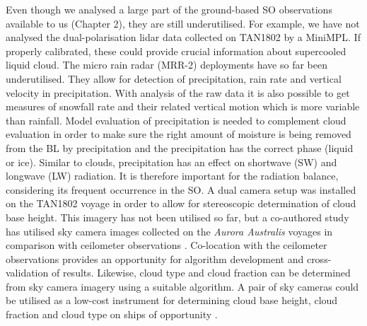 Even though we analysed a large part of the ground-based SO observations
available to us (Chapter 2), they are still underutilised. For example,
we have not analysed the dual-polarisation lidar data collected on TAN1802
by a MiniMPL. If properly calibrated, these could provide crucial information
about supercooled liquid cloud. The micro rain radar (MRR-2) deployments
have so far been underutilised. They allow for detection of precipitation,
rain rate and vertical velocity in precipitation.
With analysis of the raw data it is also possible to get measures of snowfall
rate and their related vertical motion which is more variable than rainfall.
Model evaluation of
precipitation is needed to complement cloud evaluation in order to make
sure the right amount of moisture is being removed from the BL by precipitation
and the precipitation has the correct phase (liquid or ice). Similar to clouds,
precipitation has an effect on shortwave (SW) and longwave (LW) radiation. It is therefore important
for the radiation balance, considering its frequent occurrence in the SO.
A dual camera setup was installed on the TAN1802 voyage in order to allow
for stereoscopic determination of cloud base height. This imagery has not been
utilised so far, but a co-authored study has utilised sky camera images collected
on the \textit{Aurora Australis} voyages in comparison with
ceilometer observations \citep{klekociuk2018}.
Co-location with the ceilometer observations provides an
opportunity for algorithm development and cross-validation of results.
Likewise, cloud type and cloud fraction can be determined from sky camera
imagery using a suitable algorithm. A pair of sky cameras could be utilised as
a low-cost instrument for determining cloud base height, cloud fraction
and cloud type on ships of opportunity \citep{klekociuk2018}.

